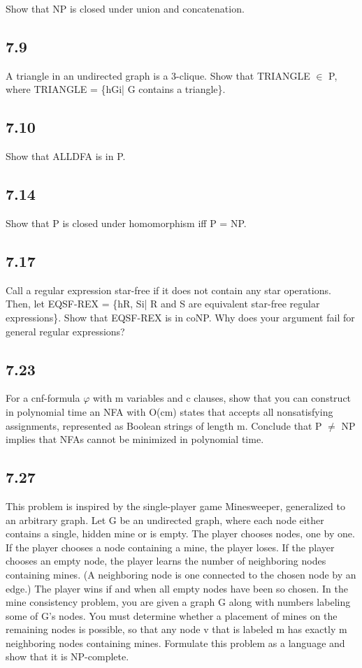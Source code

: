 Show that NP is closed under union and concatenation.


\subsection*{7.9}

A triangle in an undirected graph is a 3-clique. Show that TRIANGLE $\in$ P, where TRIANGLE = \{hGi| G contains a triangle\}.


\subsection*{7.10}

Show that ALLDFA is in P.


\subsection*{7.14}

Show that P is closed under homomorphism iff P = NP.


\subsection*{7.17}

Call a regular expression star-free if it does not contain any star operations. Then, let EQSF-REX = \{hR, Si| R and S are equivalent star-free regular expressions\}. Show that EQSF-REX is in coNP. Why does your argument fail for general regular expressions?


\subsection*{7.23}

For a cnf-formula $\varphi$ with m variables and c clauses, show that you can construct in polynomial time an NFA with O(cm) states that accepts all nonsatisfying assignments, represented as Boolean strings of length m. Conclude that P $\neq$ NP implies that NFAs cannot be minimized in polynomial time.


\subsection*{7.27}

This problem is inspired by the single-player game Minesweeper, generalized to an arbitrary graph. Let G be an undirected graph, where each node either contains a single, hidden mine or is empty. The player chooses nodes, one by one. If the player chooses a node containing a mine, the player loses. If the player chooses an empty node, the player learns the number of neighboring nodes containing mines. (A neighboring node is one connected to the chosen node by an edge.) The player wins if and when all empty nodes have been so chosen. In the mine consistency problem, you are given a graph G along with numbers labeling some of G's nodes. You must determine whether a placement of mines on the remaining nodes is possible, so that any node v that is labeled m has exactly m neighboring nodes containing mines. Formulate this problem as a language and show that it is NP-complete.


